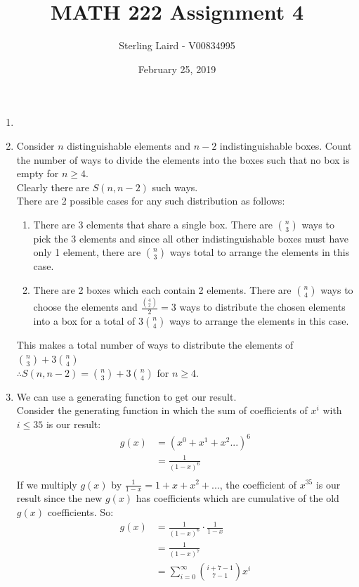 \documentclass[11pt]{article}
\title{MATH 222 Assignment 4}
\author{Sterling Laird - V00834995}
\date{February 25, 2019}
\begin{document}
\maketitle
\pagebreak

\begin{enumerate}[]
\item
\item
Consider $n$ distinguishable elements and $n-2$ indistinguishable boxes. Count the number of ways to divide the elements into the boxes such that no box is empty for $n\geq 4$.\\
Clearly there are $S(n,n-2)$ such ways.\\
There are 2 possible cases for any such distribution as follows:
	\begin{enumerate}
	\item There are 3 elements that share a single box. There are $\binom{n}{3}$ ways to pick the 3 elements and since all other indistinguishable boxes must have only 1 element, there are $\binom{n}{3}$ ways total to arrange the elements in this case.
	\item There are 2 boxes which each contain 2 elements. There are $\binom{n}{4}$ ways to choose the elements and $\frac{\binom{4}{2}}{2} = 3$ ways to distribute the chosen elements into a box for a total of $3\binom{n}{4}$ ways to arrange the elements in this case.
	\end{enumerate}
This makes a total number of ways to distribute the elements of $\binom{n}{3}+3\binom{n}{4}$\\
$\therefore S(n,n-2)=\binom{n}{3}+3\binom{n}{4}$ for $n\geq 4$.
\item
We can use a generating function to get our result.\\
Consider the generating function in which the sum of coefficients of $x^i$ with $i\leq 35$ is our result:
	\begin{align}
		g(x)&=(x^0+x^1+x^2...)^6 \nonumber\\
		&=\frac{1}{(1-x)^6} \nonumber\\
	\end{align}
If we multiply $g(x)$ by $\frac{1}{1-x}=1+x+x^2+...$, the coefficient of $x^{35}$ is our result since the new $g(x)$ has coefficients which are cumulative of the old $g(x)$ coefficients. So:
	\begin{align}
		g(x)&=\frac{1}{(1-x)^6}\cdot \frac{1}{1-x} \nonumber\\
		&=\frac{1}{(1-x)^7} \nonumber\\
		&=\sum_{i=0}^{\infty} \binom{i+7-1}{7-1}x^i  \nonumber\\

\end{align}
\end{enumerate}
\end{document}

